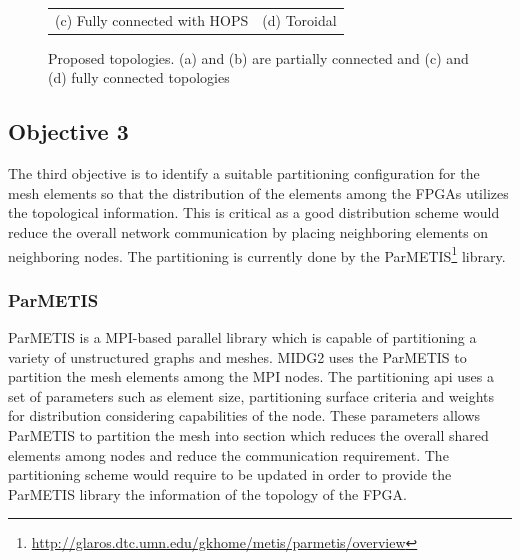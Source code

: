 \documentclass[english,notitlepage]{hgbreport}
\begin{document}
\begin{figure}[h]
\begin{tabular}{c@{\hskip 0.5in}c}
		(c) Fully connected with HOPS & (d) Toroidal
	\end{tabular}
	\caption{Proposed topologies. (a) and (b) are partially connected and (c) and (d)
	fully connected topologies} 
	\label{fig:topologies}
\end{figure}


\subsection{Objective 3}

The third objective is to identify a suitable partitioning configuration for the mesh elements so that
the distribution of the elements among the FPGAs utilizes the topological information. This is critical
as a good distribution scheme would reduce the overall network communication by placing neighboring elements
on neighboring nodes. The partitioning is currently done by the ParMETIS\footnote{\url{http://glaros.dtc.umn.edu/gkhome/metis/parmetis/overview}}
library. 

\subsubsection{ParMETIS}

ParMETIS is a MPI-based parallel library which is capable of partitioning a variety of unstructured graphs and meshes. MIDG2
uses the ParMETIS to partition the mesh elements among the MPI nodes. The partitioning api uses a set of parameters such as element
size, partitioning surface criteria and weights for distribution considering capabilities of the node. These parameters allows
ParMETIS to partition the mesh into section which reduces the overall shared elements among nodes and reduce the communication requirement.
The partitioning scheme would require to be updated in order to provide the ParMETIS library the information of the topology of the FPGA.
\end{document}
